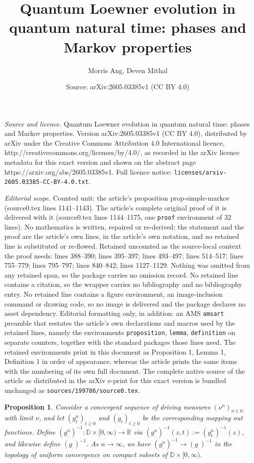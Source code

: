 \documentclass[10pt,a4paper]{amsart}
\title{Quantum Loewner evolution in quantum natural time: phases and Markov properties}
\author{Morris Ang, Deven Mithal}
\date{Source: arXiv:2605.03385v1 (CC BY 4.0)}
\newtheorem{proposition}{Proposition}
\newcommand{\D}{\mathbb{D}}
\newcommand{\N}{\mathbb{N}}
\newcommand{\R}{\mathbb{R}}
\begin{document}
\maketitle

\noindent\emph{Source and licence.} Quantum Loewner evolution in quantum natural time: phases and Markov properties. Version arXiv:2605.03385v1 (CC BY 4.0), distributed by arXiv under the Creative Commons Attribution 4.0 International licence, http://creativecommons.org/licenses/by/4.0/, as recorded in the arXiv licence metadata for this exact version and shown on the abstract page https://arxiv.org/abs/2605.03385v1. Full licence notice: \texttt{licenses/arxiv-2605.03385-CC-BY-4.0.txt}.\par\smallskip

\noindent\textit{Editorial scope.} Counted unit: the article's proposition prop-simple-markov (source0.tex lines 1141--1143). The article's complete original proof of it is delivered with it (source0.tex lines 1144--1175, one \texttt{proof} environment of 32 lines). No mathematics is written, repaired or re-derived: the statement and the proof are the article's own lines, in the article's own notation, and no retained line is substituted or re-flowed.  Retained uncounted as the source-local context the proof needs: lines 388--390; lines 395--397; lines 493--497; lines 514--517; lines 755--779; lines 795--797; lines 840--842; lines 1127--1129.  Nothing was omitted from any retained span, so the package carries no omission record.  No retained line contains a citation, so the wrapper carries no bibliography and no bibliography entry.  No retained line contains a figure environment, an image-inclusion command or drawing code, so no image is delivered and the package declares no asset dependency.  Editorial formatting only, in addition: an AMS \texttt{amsart} preamble that restates the article's own declarations and macros used by the retained lines, namely the environments \texttt{proposition}, \texttt{lemma}, \texttt{definition} on separate counters, together with the standard packages those lines need.  The retained environments print in this document as Proposition 1, Lemma 1, Definition 1 in order of appearance, whereas the article prints the same items with the numbering of its own full document.  The complete native source of the article as distributed in the arXiv e-print for this exact version is bundled unchanged as \texttt{sources/199786/source0.tex}.
\begin{proposition}\label{prop-conv-loc-spacetime}
Consider a convergent sequence of driving measures $(\nu^n)_{n \in \N}$ with limit $\nu$, and let $(g^n_t)_{t \geq 0}$ and $(g_t)_{t \geq 0}$ be the corresponding mapping out functions. Define $(g^n_\cdot)^{-1}: \D \times [0,\infty) \to \R$ via $(g^n_\cdot)^{-1}(z, t) := (g^n_t)^{-1}(z)$, and likewise define  $(g_\cdot)^{-1}$. As $n \to \infty$, we have $(g^n_\cdot)^{-1}\to (g_\cdot)^{-1}$ in the topology of uniform convergence on compact subsets of $\D \times [0,\infty)$. 
\end{proposition}
\end{document}
